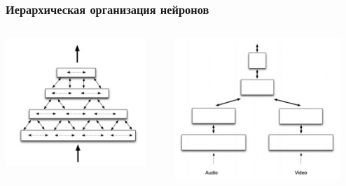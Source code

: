 \documentclass[default]{beamer}
\begin{document}
	\begin{frame}
		\frametitle{Иерархическая организация нейронов}
		
		\begin{columns}
			\begin{column}{0.5\textwidth}
				\includegraphics[width=0.9\textwidth]{mpf/hierarchy}
			\end{column}
			\begin{column}{0.5\textwidth}
				\includegraphics[width=0.9\textwidth]{mpf/hierarchy_conv}
			\end{column}
		\end{columns}

	\end{frame}
\end{document}
